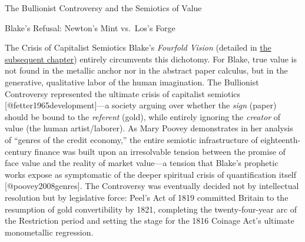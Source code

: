 \documentclass[
  ignorenonframetext,
]{beamer}
\begin{document}
\begin{frame}{The Bullionist Controversy and the Semiotics of Value}
\begin{block}{Blake's Refusal: Newton's Mint vs.~Los's Forge}
\begin{block}{The Crisis of Capitalist Semiotics}
\protect{}\label{the-crisis-of-capitalist-semiotics}
Blake's \emph{Fourfold Vision} (detailed in
\href{03a_urizenic_materialism.md\#urizenic-materialism-and-the-generation-of-allegoric-riches}{the
subsequent chapter}) entirely circumvents this dichotomy. For Blake,
true value is not found in the metallic anchor nor in the abstract paper
calculus, but in the generative, qualitative labor of the human
imagination. The Bullionist Controversy represented the ultimate crisis
of capitalist semiotics {[}@fetter1965development{]}---a society arguing
over whether the \emph{sign} (paper) should be bound to the
\emph{referent} (gold), while entirely ignoring the \emph{creator} of
value (the human artist/laborer). As Mary Poovey demonstrates in her
analysis of ``genres of the credit economy,'' the entire semiotic
infrastructure of eighteenth-century finance was built upon an
irresolvable tension between the promise of face value and the reality
of market value---a tension that Blake's prophetic works expose as
symptomatic of the deeper spiritual crisis of quantification itself
{[}@poovey2008genres{]}. The Controversy was eventually decided not by
intellectual resolution but by legislative force: Peel's Act of 1819
committed Britain to the resumption of gold convertibility by 1821,
completing the twenty-four-year arc of the Restriction period and
setting the stage for the 1816 Coinage Act's ultimate monometallic
regression.
\end{block}
\end{block}
\end{frame}
\end{document}
